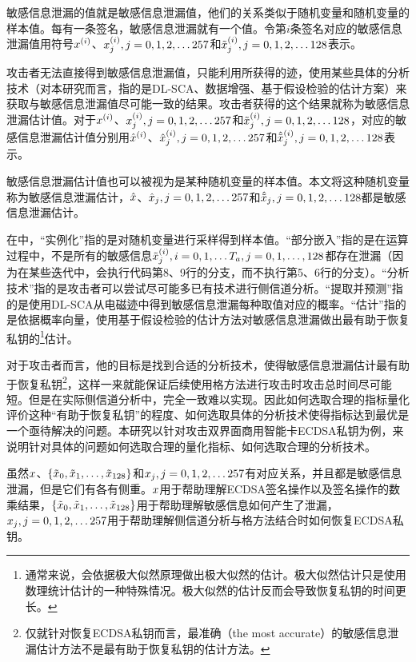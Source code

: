 {	敏感信息泄漏的值就是敏感信息泄漏值，他们的关系类似于随机变量和随机变量的样本值。每有一条签名，敏感信息泄漏就有一个值。令第$i$条签名对应的敏感信息泄漏值用符号$x^{(i)}$、$x^{(i)}_j,j=0,1,2,\dots257$和$\tilde{x}^{(i)}_j,j=0,1,2,\dots128$表示。

	攻击者无法直接得到敏感信息泄漏值，只能利用所获得的迹，使用某些具体的分析技术（对本研究而言，指的是DL-SCA、数据增强、基于假设检验的估计方案）来获取与敏感信息泄漏值尽可能一致的结果。攻击者获得的这个结果就称为敏感信息泄漏估计值。对于$x^{(i)}$、$x^{(i)}_j,j=0,1,2,\dots257$和$\tilde{x}^{(i)}_j,j=0,1,2,\dots128$，对应的敏感信息泄漏估计值分别用$\hat{x}^{(i)}$、$\hat{x}^{(i)}_j,j=0,1,2,\dots257$和$\hat{\tilde{x}}^{(i)}_j,j=0,1,2,\dots128$表示。
	
	敏感信息泄漏估计值也可以被视为是某种随机变量的样本值。本文将这种随机变量称为敏感信息泄漏估计，$\hat{x}$、$\hat{x}_j,j=0,1,2,\dots257$和$\hat{\tilde{x}}_j,j=0,1,2,\dots128$都是敏感信息泄漏估计。
	
	在中，“实例化”指的是对随机变量进行采样得到样本值。“部分嵌入”指的是在运算过程中，不是所有的敏感信息$\tilde {x}^{(i)}_j,i=0,1,\dots T_a,j=0,1,\dots,128$都存在泄漏（因为在某些迭代中，会执行代码第8、9行的分支，而不执行第5、6行的分支）。“分析技术”指的是攻击者可以尝试尽可能多已有技术进行侧信道分析。“提取并预测”指的是使用DL-SCA从电磁迹中得到敏感信息泄漏每种取值对应的概率。“估计”指的是依据概率向量，使用基于假设检验的估计方法对敏感信息泄漏做出最有助于恢复私钥的\footnote{通常来说，会依据极大似然原理做出极大似然的估计。极大似然估计只是使用数理统计估计的一种特殊情况。极大似然的估计反而会导致恢复私钥的时间更长。}估计。
	
	对于攻击者而言，他的目标是找到合适的分析技术，使得敏感信息泄漏估计最有助于恢复私钥\footnote{仅就针对恢复ECDSA私钥而言，最准确（the most accurate）的敏感信息泄漏估计方法不是最有助于恢复私钥的估计方法。}，这样一来就能保证后续使用格方法进行攻击时攻击总时间尽可能短。但是在实际侧信道分析中，完全一致难以实现。因此如何选取合理的指标量化评价这种“有助于恢复私钥”的程度、如何选取具体的分析技术使得指标达到最优是一个亟待解决的问题。本研究以针对攻击双界面商用智能卡ECDSA私钥为例，来说明针对具体的问题如何选取合理的量化指标、如何选取合理的分析技术。
	
	虽然$x$、$\left\{\tilde{x}_0,\tilde{x}_1,\dots,\tilde{x}_{128}\right\}$和$x_j,j=0,1,2,\dots257$有对应关系，并且都是敏感信息泄漏，但是它们有各有侧重。$x$用于帮助理解ECDSA签名操作以及签名操作的数乘结果，$\left\{\tilde{x}_0,\tilde{x}_1,\dots,\tilde{x}_{128}\right\}$用于帮助理解敏感信息如何产生了泄漏，$x_j,j=0,1,2,\dots257$用于帮助理解侧信道分析与格方法结合时如何恢复ECDSA私钥。
	
}
